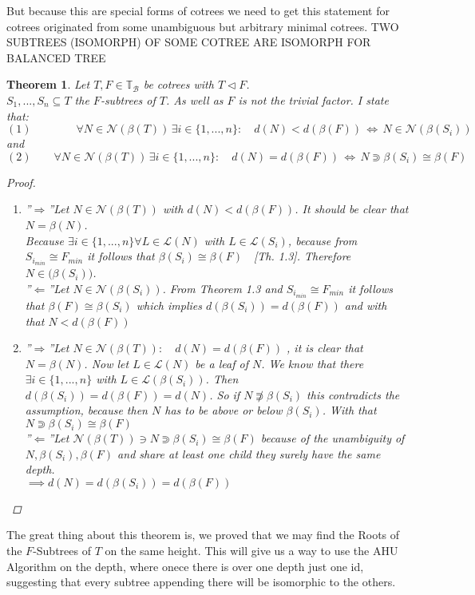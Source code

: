 \documentclass[a4paper,12pt]{article}
\newtheorem{theorem}{Theorem}[section]
\theoremstyle{definition}
\begin{document}
		But because this are special forms of cotrees we need to get this statement for cotrees originated from some unambiguous but arbitrary minimal cotrees. 
		TWO SUBTREES (ISOMORPH) OF SOME COTREE ARE ISOMORPH FOR BALANCED TREE
		\begin{theorem}
			Let $T,F\in\mathds{T}_{\mathcal{B}}$ be cotrees with $T\vartriangleleft F$.\\ $S_1,...,S_n\subseteq T$ the $F$-subtrees of $T$. As well as $F$ is not the trivial factor. I state that:
			\[(1)\qquad \qquad \forall N\in \mathcal{N}(\beta(T))\, \exists i\in\{1,...,n\}:\quad d(N)< d(\beta(F))\,\Longleftrightarrow\, N\in \mathcal{N}(\beta(S_i)) \]
			and 
			\[(2)\qquad \forall N\in \mathcal{N}(\beta(T))\, \exists i\in\{1,...,n\}:\quad d(N)= d(\beta(F))\,\Longleftrightarrow\, N \Supset \beta(S_i)\cong \beta(F) \]
			\begin{proof}
				\begin{enumerate}[(1)]
					\item ''$\Rightarrow$''\quad Let  $ N\in \mathcal{N}(\beta(T))$ with $ d(N)< d(\beta(F))$. It should be clear that $N=\beta (N)$.\\ Because $\exists i\in\{1,...,n\}\forall L \in \mathcal{L}(N)$ with $L\in \mathcal{L}(S_i)$, because from $S_{i_{min}} \cong F_{min}$ it follows that $\beta (S_i) \cong \beta (F)\quad$[Th. 1.3]. Therefore $N \in \mathcal(\beta(S_i))$.  \\
							''$\Leftarrow$''\quad Let $N\in \mathcal{N}(\beta (S_i))$. From Theorem 1.3 and $ S_{i_{min}} \cong F_{min}$ it follows that $\beta (F) \cong \beta (S_i)$ which implies $d(\beta (S_i))=d(\beta (F))$ and with that $N<d(\beta(F))$
					\item ''$\Rightarrow$''\quad Let $N\in \mathcal{N}(\beta(T)):\quad d(N) = d(\beta (F))$ , it is clear that $N=\beta(N)$. Now let $L\in \mathcal{L}(N)$ be a leaf of $N$. We know that there $\exists i\in \{1,...,n\}$ with $L\in \mathcal{L}(\beta (S_i))$. Then $d(\beta(S_i)) = d(\beta (F)) = d(N)$. So if $N \not \Supset \beta(S_i)$ this contradicts the assumption, because then $N$ has to be above or below $\beta(S_i)$. With that $N  \Supset \beta(S_i)\cong \beta (F)$\\
					''$\Leftarrow$''\quad Let $\mathcal{N}(\beta(T)) \ni N \Supset \beta(S_i) \cong \beta(F)$ because of the unambiguity of $N,\beta(S_i),\beta (F)$ and share at least one child they surely have the same depth.\\
					$\implies d(N)=d(\beta(S_i))=d(\beta(F))$
				\end{enumerate}
			\end{proof}
		\end{theorem}
		The great thing about this theorem is, we proved that we may find the Roots of the $F$-Subtrees of $T$ on the same height. This will give us a way to use the AHU Algorithm on the depth, where onece there is over one depth just one id, suggesting that every subtree appending there will be isomorphic to the others. 
\end{document}
